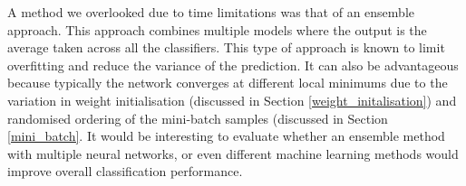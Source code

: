             A method we overlooked due to time limitations was that of an ensemble approach. This approach combines multiple models where the output is the average taken across all the classifiers. This type of approach is known to limit overfitting and reduce the variance of the prediction. It can also be advantageous because typically the network converges at different local minimums due to the variation in weight initialisation (discussed in Section \ref{weight_initalisation}) and randomised ordering of the mini-batch samples (discussed in Section \ref{mini_batch}. It would be interesting to evaluate whether an ensemble method with multiple neural networks, or even different machine learning methods would improve overall classification performance. 

   

    
    
        

        
        
        
